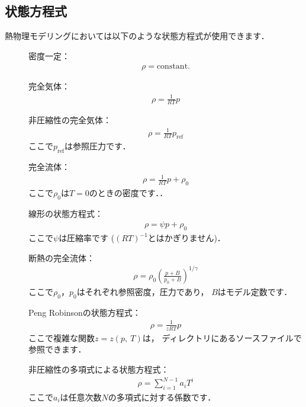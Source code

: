 \subsection{状態方程式}
\label{ssec:7.1.5@3.0.1}
熱物理モデリングにおいては以下のような状態方程式が使用できます．
\begin{description}
 \item[] 密度一定：
\begin{align}
 \label{eq:7.5@3.0.1}
 \rho = \text{constant.}
\end{align}
 \item[] 完全気体：
\begin{align}
 \label{eq:7.6@3.0.1}
 \rho = \frac{1}{RT}p
\end{align}
 \item[] 非圧縮性の完全気体：
\begin{align}
 \label{eq:7.7@3.0.1}
 \rho = \frac{1}{RT}p_{\mathrm{ref}}
\end{align}
            ここで$p_{\mathrm{ref}}$は参照圧力です．
 \item[] 完全流体：
\begin{align}
 \label{eq:7.8@3.0.1}
 \rho = \frac{1}{RT}p + \rho_{0}
\end{align}
            ここで$\rho_{0}$は$T = 0$のときの密度です．．
 \item[] 線形の状態方程式：
\begin{align}
 \label{eq:7.9@3.0.1}
 \rho = \psi p + \rho_{0}
\end{align}
            ここで$\psi$は圧縮率です ($(RT)^{-1}$とはかぎりません)．
 \item[] 断熱の完全流体：
\begin{align}
 \label{eq:7.10@3.0.1}
 \rho = \rho_{0}\left(\frac{p + B}{p_{0} + B}\right)^{1/\gamma}
\end{align}
            ここで$\rho_{0}$，$p_{0}$はそれぞれ参照密度，圧力であり，
            $B$はモデル定数です．
 \item[] Peng Robinsonの状態方程式：
\begin{align}
 \label{eq:7.11@3.0.1}
 \rho = \frac{1}{zRT}p
\end{align}
            ここで複雑な関数$z = z(p,\ T)$は，
            ディレクトリにあるソースファイルで参照できます．
 \item[] 非圧縮性の多項式による状態方程式：
\begin{align}
 \label{eq:7.12@3.0.1}
 \rho = \sum^{N-1}_{i=1}a_{i}T^{i}
\end{align}
            ここで$a_{i}$は任意次数$N$の多項式に対する係数です．
\end{description}


